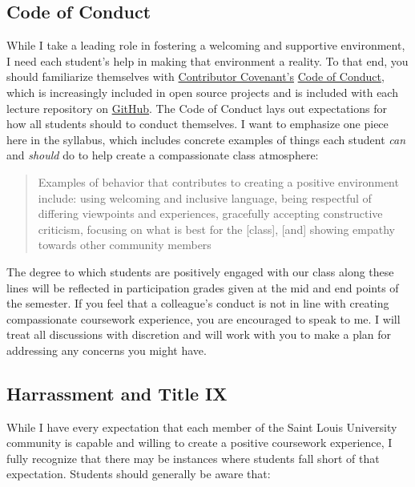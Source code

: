 \documentclass[
]{book}
\begin{document}
\hypertarget{code-of-conduct}{%
\subsection{Code of Conduct}\label{code-of-conduct}}

While I take a leading role in fostering a welcoming and supportive environment, I need each student's help in making that environment a reality. To that end, you should familiarize themselves with \href{https://www.contributor-covenant.org}{Contributor Covenant's} \href{https://www.contributor-covenant.org/version/1/4/code-of-conduct}{Code of Conduct}, which is increasingly included in open source projects and is included with each lecture repository on \href{https://github.com/slu-soc5650}{GitHub}. The Code of Conduct lays out expectations for how all students should to conduct themselves. I want to emphasize one piece here in the syllabus, which includes concrete examples of things each student \emph{can} and \emph{should} do to help create a compassionate class atmosphere:

\begin{quote}
Examples of behavior that contributes to creating a positive environment include: using welcoming and inclusive language, being respectful of differing viewpoints and experiences, gracefully accepting constructive criticism, focusing on what is best for the {[}class{]}, {[}and{]} showing empathy towards other community members
\end{quote}

The degree to which students are positively engaged with our class along these lines will be reflected in participation grades given at the mid and end points of the semester. If you feel that a colleague's conduct is not in line with creating compassionate coursework experience, you are encouraged to speak to me. I will treat all discussions with discretion and will work with you to make a plan for addressing any concerns you might have.

\hypertarget{harrassment-and-title-ix}{%
\subsection{Harrassment and Title IX}\label{harrassment-and-title-ix}}

While I have every expectation that each member of the Saint Louis University community is capable and willing to create a positive coursework experience, I fully recognize that there may be instances where students fall short of that expectation. Students should generally be aware that:
\end{document}
